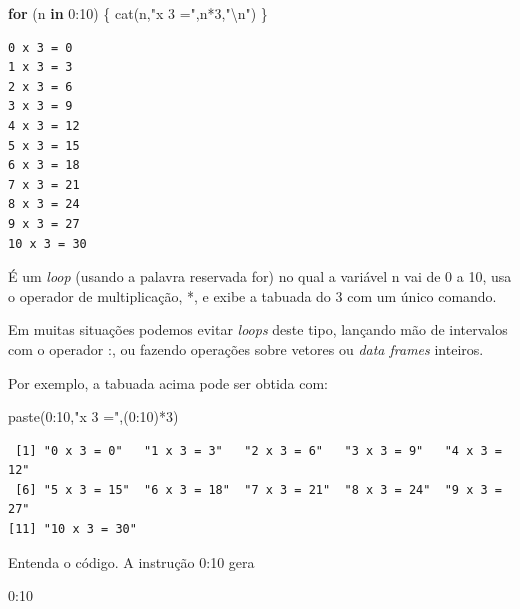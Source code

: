 \documentclass[
]{article}
\newenvironment{Shaded}{\begin{snugshade}}{\end{snugshade}}
\newcommand{\ControlFlowTok}[1]{\textcolor[rgb]{0.13,0.29,0.53}{\textbf{#1}}}
\newcommand{\DecValTok}[1]{\textcolor[rgb]{0.00,0.00,0.81}{#1}}
\newcommand{\FunctionTok}[1]{\textcolor[rgb]{0.00,0.00,0.00}{#1}}
\newcommand{\NormalTok}[1]{#1}
\newcommand{\SpecialCharTok}[1]{\textcolor[rgb]{0.00,0.00,0.00}{#1}}
\newcommand{\StringTok}[1]{\textcolor[rgb]{0.31,0.60,0.02}{#1}}
\begin{document}
\begin{Shaded}
\begin{Highlighting}[]
\ControlFlowTok{for}\NormalTok{ (n }\ControlFlowTok{in} \DecValTok{0}\SpecialCharTok{:}\DecValTok{10}\NormalTok{) }
\NormalTok{\{}
  \FunctionTok{cat}\NormalTok{(n,}\StringTok{"x 3 ="}\NormalTok{,n}\SpecialCharTok{*}\DecValTok{3}\NormalTok{,}\StringTok{"}\SpecialCharTok{\textbackslash{}n}\StringTok{"}\NormalTok{)}
\NormalTok{\}}
\end{Highlighting}
\end{Shaded}

\begin{verbatim}
0 x 3 = 0 
1 x 3 = 3 
2 x 3 = 6 
3 x 3 = 9 
4 x 3 = 12 
5 x 3 = 15 
6 x 3 = 18 
7 x 3 = 21 
8 x 3 = 24 
9 x 3 = 27 
10 x 3 = 30 
\end{verbatim}

É um \emph{loop} (usando a palavra reservada for) no qual a variável n
vai de 0 a 10, usa o operador de multiplicação, *, e exibe a tabuada do
3 com um único comando.

Em muitas situações podemos evitar \emph{loops} deste tipo, lançando mão
de intervalos com o operador :, ou fazendo operações sobre vetores ou
\emph{data frames} inteiros.

Por exemplo, a tabuada acima pode ser obtida com:

\begin{Shaded}
\begin{Highlighting}[]
\FunctionTok{paste}\NormalTok{(}\DecValTok{0}\SpecialCharTok{:}\DecValTok{10}\NormalTok{,}\StringTok{"x 3 ="}\NormalTok{,(}\DecValTok{0}\SpecialCharTok{:}\DecValTok{10}\NormalTok{)}\SpecialCharTok{*}\DecValTok{3}\NormalTok{)}
\end{Highlighting}
\end{Shaded}

\begin{verbatim}
 [1] "0 x 3 = 0"   "1 x 3 = 3"   "2 x 3 = 6"   "3 x 3 = 9"   "4 x 3 = 12" 
 [6] "5 x 3 = 15"  "6 x 3 = 18"  "7 x 3 = 21"  "8 x 3 = 24"  "9 x 3 = 27" 
[11] "10 x 3 = 30"
\end{verbatim}

Entenda o código. A instrução 0:10 gera

\begin{Shaded}
\begin{Highlighting}[]
\DecValTok{0}\SpecialCharTok{:}\DecValTok{10}
\end{Highlighting}
\end{Shaded}
\end{document}
